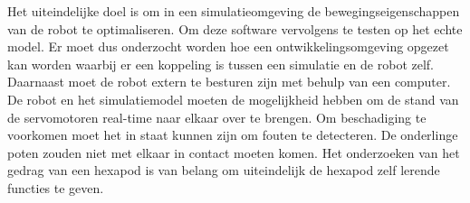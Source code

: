 \documentclass[10pt,a4paper]{article}
\begin{document}
Het uiteindelijke doel is om in een simulatieomgeving de bewegingseigenschappen van de robot te optimaliseren. Om deze software vervolgens te testen op het echte model. Er moet dus onderzocht worden hoe een ontwikkelingsomgeving opgezet kan worden waarbij er een koppeling is tussen een simulatie en de robot zelf. Daarnaast moet de robot extern te besturen zijn met behulp van een computer. De robot en het simulatiemodel moeten de mogelijkheid hebben om de stand van de servomotoren real-time naar elkaar over te brengen. Om beschadiging te voorkomen moet het in staat kunnen zijn om fouten te detecteren. De onderlinge poten zouden niet met elkaar in contact moeten komen. Het onderzoeken van het gedrag van een hexapod is van belang om uiteindelijk de hexapod zelf lerende functies te geven.
\newpage

\iffalse %
\textbf{Hoofdvraag\\}
De hoofdvraag van het onderzoek betreft:
Hoe wordt een ontwikkelingsomgeving opgezet waarbij een robot aan een simulatie gekoppeld wordt?

\textbf{Deelvragen\\}
De onderzoeksvraag is onder te verdelen in verschillende deelvragen:
\begin{itemize}
\setlength\itemsep{0em}
\item Wat is een hexapod?
\item Welke draadloze techniek kan het beste worden toegepast als communicatiemiddel?
\item Wat zijn effici\"ente looppatronen voor een hexapod op verschillende oppervlakken?
\item Is een hexapod in staat om zich voort te bewegen met één of meerdere beperkingen aan zijn poten?
\item Zijn er effici\"entere looppatronen bij een zwaardere belasting van de hexapod?
\item Zijn er verschillen tussen de simulatie en de werkelijkheid?
\item Hoe detecteert de hexapod dat er een onmogelijke bewegingsactie uitgevoerd moet worden?
\item Hoe verkent de hexapod zijn omgeving en onderscheid deze objecten van elkaar?
\item Kan de robot zich voortbewegen ongeacht de orie\"entatie?
\end{itemize}
\fi

\iffalse %
\end{document}

